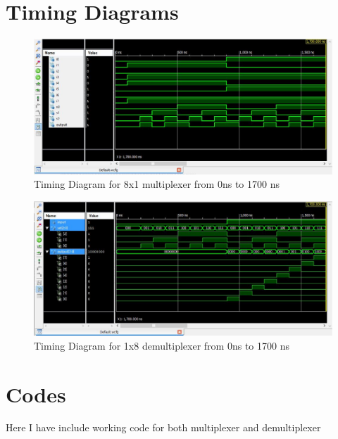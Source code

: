 \documentclass[12pt]{article}
\begin{document}
\section{Timing Diagrams}
\begin{figure}[!ht]
\centering
\includegraphics[scale=0.7]{mux}
\caption{Timing Diagram for 8x1 multiplexer from 0ns to 1700 ns}
\label{fig1}
\end{figure}
\begin{figure}[!ht]
\centering
\includegraphics[scale=0.7]{demux}
\caption{Timing Diagram for 1x8 demultiplexer from 0ns to 1700 ns}
\label{fig2}
\end{figure}
\section{Codes}
Here I have include working code for both multiplexer and demultiplexer
\end{document}
